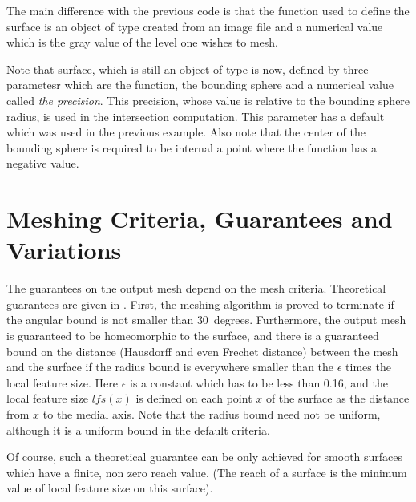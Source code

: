 The main difference with the previous code 
is that the function used to define the surface
is  an object of type   created from
an image file and a numerical value  which is  the
 gray value of the level one wishes to mesh.

Note that  surface, which is still an object of type  
is now, defined by three parametesr which are the function, the bounding
sphere and a numerical value called {\em the precision}. This
precision, whose value
is relative to the bounding sphere radius, is used in the intersection
computation.
This parameter has a default which was used in the previous example.
Also note that the center of the bounding sphere is required to be
internal a point where the function has a negative value.






\section{Meshing Criteria, Guarantees and Variations}
\label{SurfaceMesher_section_criteria}
\label{SurfaceMesher_section_variations}

The guarantees on the output mesh depend on the mesh criteria.
Theoretical guarantees are given in \cite{cgal:bo-pgsms-05}.
First, the meshing algorithm is proved to terminate 
if the angular bound is
not smaller than $30$~degrees. 
Furthermore, the output mesh 
is guaranteed to be homeomorphic to the surface,
and  there is a guaranteed bound 
on the  distance (Hausdorff and even Frechet distance)
between the mesh and the surface
if the radius bound is everywhere smaller than 
the $\epsilon$ times the local feature size. 
Here $\epsilon$ is a constant which has to be
less than 0.16, and the local feature size 
$lfs(x)$ is defined on each point $x$ of the surface
as the distance from $x$ to the medial axis.  
Note that the radius bound need not be uniform,
although it is a uniform bound in the default criteria.

Of course, such a theoretical guarantee can be only achieved
for smooth surfaces which have a finite, non zero
reach value. (The reach of a surface is the minimum value 
of local feature size on
this surface).

